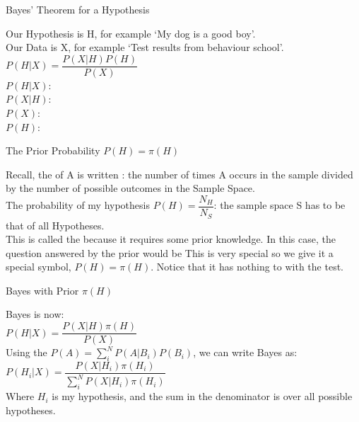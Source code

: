 \documentclass[10pt,sans,english,compress,xcolor=dvipsnames]{beamer}
\begin{document}
\begin{frame}[fragile]{Bayes' Theorem for a Hypothesis}

Our Hypothesis is H, for example `My dog is a good boy'.\\[1ex]
Our Data is X, for example `Test results from behaviour school'.\\[1ex]

$P(H | X) = \dfrac{ P(X|H) P(H) } { P(X) } $\\[1ex]

$P(H | X)$: \\[1ex]
$P(X | H)$: \\[1ex]
$P(X)$: \\[1ex]
$P(H)$: \\[1ex]

\end{frame} 


\begin{frame}[fragile]{The Prior Probability $P(H) = \pi(H)$}

Recall, the  of A is written :  the number of times A occurs in the sample divided by the number of possible outcomes in the Sample Space. \\[1ex] 

The probability of my hypothesis $P(H)= \dfrac{N_H}{N_S}$: the sample space S has to be that of all Hypotheses.\\[1ex]

This is called the  because it requires some prior knowledge. In this case, the question answered by the prior would be  This is very special so we give it a special symbol,  $P(H) = \pi(H)$. Notice that it has nothing to with the test. \\[1ex]

\end{frame} 


\begin{frame}[fragile]{Bayes with Prior $ \pi(H)$}

Bayes is now:\\[1ex]
$P(H | X) = \dfrac{ P(X|H) \pi(H) } { P(X) } $\\[1ex]

Using the   $P(A) = \sum \limits_i^N P(A | B_i) P(B_i)$, we can write Bayes as:\\[1ex]

$P(H_i | X) = \dfrac{ P(X | H_i) \pi(H_i) } { \sum\limits_i^N P(X | H_i) \pi(H_i)}$ \\[1ex]

Where $H_i$ is my hypothesis, and the sum in the denominator is over all possible hypotheses.



\end{frame} 
\end{document}
